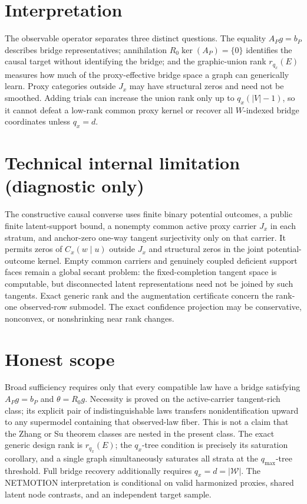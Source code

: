 \documentclass{article}
\begin{document}
\section{Interpretation}

The observable operator separates three distinct questions.  The equality \(A_Pg=b_P\) describes bridge representatives; annihilation \(R_0\ker(A_P)=\{0\}\) identifies the causal target without identifying the bridge; and the graphic-union rank \(r_{q_x}(E)\) measures how much of the proxy-effective bridge space a graph can generically learn.  Proxy categories outside \(J_x\) may have structural zeros and need not be smoothed.  Adding trials can increase the union rank only up to \(q_x(|V|-1)\), so it cannot defeat a low-rank common proxy kernel or recover all \(W\)-indexed bridge coordinates unless \(q_x=d\).

\section*{Technical internal limitation (diagnostic only)}

The constructive causal converse uses finite binary potential outcomes, a public finite latent-support bound, a nonempty common active proxy carrier \(J_x\) in each stratum, and anchor-zero one-way tangent surjectivity only on that carrier.  It permits zeros of \(C_x(w\mid u)\) outside \(J_x\) and structural zeros in the joint potential-outcome kernel.  Empty common carriers and genuinely coupled deficient support faces remain a global secant problem: the fixed-completion tangent space is computable, but disconnected latent representations need not be joined by such tangents.  Exact generic rank and the augmentation certificate concern the rank-one observed-row submodel.  The exact confidence projection may be conservative, nonconvex, or nonshrinking near rank changes.

\section{Honest scope}

Broad sufficiency requires only that every compatible law have a bridge satisfying \(A_Pg=b_P\) and \(\theta=R_0g\).  Necessity is proved on the active-carrier tangent-rich class; its explicit pair of indistinguishable laws transfers nonidentification upward to any supermodel containing that observed-law fiber.  This is not a claim that the Zhang or Su theorem classes are nested in the present class.  The exact generic design rank is \(r_{q_x}(E)\); the \(q_x\)-tree condition is precisely its saturation corollary, and a single graph simultaneously saturates all strata at the \(q_{\max}\)-tree threshold.  Full bridge recovery additionally requires \(q_x=d=|\mathcal W|\).  The NETMOTION interpretation is conditional on valid harmonized proxies, shared latent node contrasts, and an independent target sample.
\end{document}
